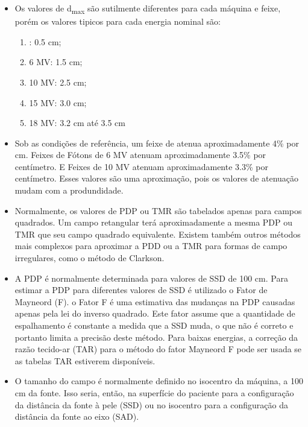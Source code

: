 \documentclass[11pt,a4paper]{article}
\newcounter{exemplo}
\begin{document}
\begin{exemplo}
\begin{itemize}
        \item Os valores de d\textsubscript{max} são sutilmente diferentes para cada máquina e feixe, porém os valores tipicos para cada energia nominal são:
        
            \begin{enumerate}[label=\alph*)]
                \item {}: 0.5 cm;
                \item 6 MV: 1.5 cm;
                \item 10 MV: 2.5 cm;
                \item 15 MV: 3.0 cm;
                \item 18 MV: 3.2 cm até 3.5 cm
            \end{enumerate}

        \item Sob as condições de referência, um feixe de  atenua aproximadamente 4\% por cm.  Feixes de Fótons de 6 MV atenuam aproximadamente 3.5\% por centímetro. E Feixes de 10 MV atenuam aproximadamente 3.3\% por centímetro. Esses valores são uma aproximação, pois os valores de atenuação mudam com a produndidade.
        
        \item Normalmente, os valores de PDP ou TMR são tabelados apenas para campos quadrados. Um campo retangular terá aproximadamente a mesma PDP ou TMR que seu campo quadrado equivalente. Existem também outros métodos mais complexos para aproximar a PDD ou a TMR para formas de campo irregulares, como o método de Clarkson.
        
        \item A PDP é normalmente determinada para valores de SSD de 100 cm. Para estimar a PDP para diferentes valores de SSD é utilizado o Fator de Mayneord (F). o Fator F é uma estimativa das mudanças na PDP causadas apenas pela lei do inverso quadrado. Este fator assume que a quantidade de espalhamento é constante a medida que a SSD muda, o que não é correto e portanto limita a precisão deste método. Para baixas energias, a correção da razão tecido-ar (TAR) para o método do fator Mayneord F pode ser usada se as tabelas TAR estiverem disponíveis.
        
        \item O tamanho do campo é normalmente definido no isocentro da máquina, a 100 cm da fonte. Isso seria, então, na superfície do paciente para a configuração da distância da fonte à pele (SSD) ou no isocentro para a configuração da distância da fonte ao eixo (SAD).
        

\end{itemize}
\end{exemplo}
\end{document}
